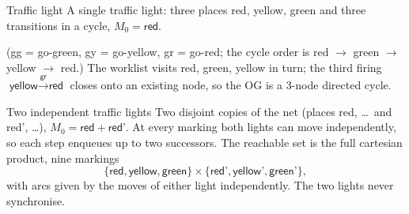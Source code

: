 \begin{examplebox}{Traffic light}
A single traffic light: three places \textsf{red}, \textsf{yellow}, \textsf{green} and three transitions in a cycle, $M_0 = \textsf{red}$.
\begin{center}
\end{center}
(\textsf{gg} = go-green, \textsf{gy} = go-yellow, \textsf{gr} = go-red; the cycle order is red $\to$ green $\to$ yellow $\to$ red.) The worklist visits \textsf{red}, \textsf{green}, \textsf{yellow} in turn; the third firing $\textsf{yellow} \xrightarrow{\textsf{gr}} \textsf{red}$ closes onto an existing node, so the OG is a 3-node directed cycle.
\end{examplebox}

\begin{examplebox}{Two independent traffic lights}
Two disjoint copies of the net (places \textsf{red}, \dots\ and \textsf{red'}, \dots), $M_0 = \textsf{red} + \textsf{red'}$. At every marking both lights can move independently, so each step enqueues up to two successors. The reachable set is the full cartesian product, nine markings
\[
  \{\textsf{red}, \textsf{yellow}, \textsf{green}\} \times \{\textsf{red'}, \textsf{yellow'}, \textsf{green'}\},
\]
with arcs given by the moves of either light independently. The two lights never synchronise.
\end{examplebox}

